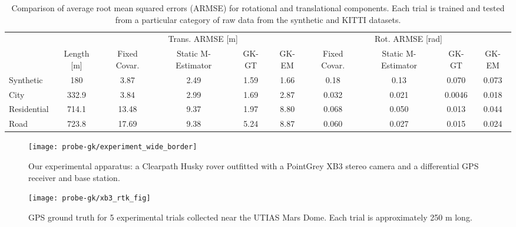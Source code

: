 \begin{table*}
\centering
\caption{Comparison of average root mean squared errors (ARMSE) for rotational
  and translational components. Each trial is trained and tested from a
  particular category of raw data from the synthetic and KITTI datasets.}
\begin{tabular}{l c c c c c c c c c }
 & & \multicolumn{4}{c}{Trans. ARMSE [m]} & \multicolumn{4}{c}{Rot. ARMSE [rad]}  \\  \cline{3-6}  \cline{7-10} \T                                                                                    
 & Length [m] & Fixed Covar. & Static M-Estimator  & GK-GT & GK-EM & Fixed Covar. &  Static M-Estimator  & GK-GT & GK-EM  \\                         
\hline \T
Synthetic & 180 & 3.87 & 2.49 & 1.59 & 1.66 & 0.18 & 0.13 & 0.070 & 0.073 \\                                                                                                                
City & 332.9 & 3.84 & 2.99 & 1.69 & 2.87 & 0.032 & 0.021 & 0.0046 & 0.018 \\ 
Residential & 714.1 & 13.48 & 9.37 & 1.97 & 8.80 & 0.068 & 0.050 & 0.013 & 0.044 \\
Road & 723.8 & 17.69 & 9.38 & 5.24 & 8.87 & 0.060 & 0.027 & 0.015 & 0.024
\\ \hline                                                                                                                
\end{tabular}               \label{table:armse_errors}
\end{table*}

\begin{figure}
    \centering
    \hspace*{0.25cm}
    \texttt{[image: probe-gk/experiment\_wide\_border]}
    \caption{Our experimental apparatus: a Clearpath Husky rover outfitted with a PointGrey XB3 stereo camera and a differential GPS receiver and base station.}
      \vspace{-0.5em}
   	    \label{fig:experiments}
\end{figure}

\begin{figure}
    \centering
	\texttt{[image: probe-gk/xb3\_rtk\_fig]}
    \caption{GPS ground truth for 5 experimental trials collected
      near the UTIAS Mars Dome. Each trial is approximately 250 m long.}
      \vspace{-0.5em}
    \label{fig:experiment_groundtruth}
\end{figure}

